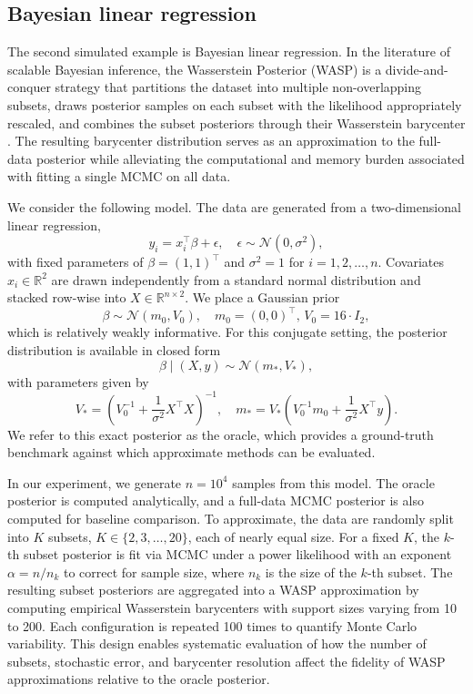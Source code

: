 \documentclass[11pt]{article}
\newcommand{\bbR}{\mathbb{R}}
\newcommand{\calN}{\mathcal{N}}
\begin{document}
\subsection{Bayesian linear regression}

The second simulated example is Bayesian linear regression. In the literature of scalable Bayesian inference, the Wasserstein Posterior (WASP) is a divide-and-conquer strategy that partitions the dataset into multiple non-overlapping subsets, draws posterior samples on each subset with the likelihood appropriately rescaled, and combines the subset posteriors through their Wasserstein barycenter \citep{srivastava_2018_ScalableBayesBarycenter}. The resulting barycenter distribution serves as an approximation to the full-data posterior while alleviating the computational and memory burden associated with fitting a single MCMC on all data. 

We consider the following model. The data are generated from a two-dimensional linear regression,
\begin{equation*}
	y_i = x_i^\top \beta + \epsilon,\quad \epsilon\sim \mathcal{N}(0, \sigma^2),
\end{equation*}
with fixed parameters of $\beta = (1,1)^\top$ and $\sigma^2 = 1$ for $i = 1, 2, \ldots, n$. Covariates $x_i \in \bbR^2$ are drawn independently from a standard normal distribution and stacked row-wise into  $X \in \bbR^{n \times 2}$. We place a Gaussian prior 
\begin{equation*}
	\beta \sim \calN(m_0, V_0),\quad m_0 = (0,0)^\top, \, V_0 = 16 \cdot I_2,
\end{equation*}
which is relatively weakly informative. For this conjugate setting, the posterior distribution is available in closed form
\begin{equation*}
	\beta \mid (X,y) \sim \mathcal{N}(m_*, V_*),
\end{equation*}
with parameters given by 
\begin{equation*}
	V_* = \left(V_0^{-1} + \frac{1}{\sigma^2} X^\top X\right)^{-1},\quad m_* = V_*(V_0^{-1} m_0 + \frac{1}{\sigma^2} X^\top y).
\end{equation*}
We refer to this exact posterior as the oracle, which provides a ground-truth benchmark against which approximate methods can be evaluated.

In our experiment, we generate $n=10^4$ samples from this model. The oracle posterior is computed analytically, and a full-data MCMC posterior is also computed for baseline comparison. To approximate, the data are randomly split into $K$ subsets, $K \in \lbrace 2,3,\ldots, 20\rbrace$, each of nearly equal size. For a fixed $K$, the $k$-th subset posterior is fit via MCMC under a power likelihood with an exponent $\alpha = n/n_k$ to correct for sample size, where $n_k$ is the size of the $k$-th subset. The resulting subset posteriors are aggregated into a WASP approximation by computing empirical Wasserstein barycenters with support sizes varying from 10 to 200. Each configuration is repeated 100 times to quantify Monte Carlo variability. This design enables systematic evaluation of how the number of subsets, stochastic error, and barycenter resolution affect the fidelity of WASP approximations relative to the oracle posterior.
\end{document}
